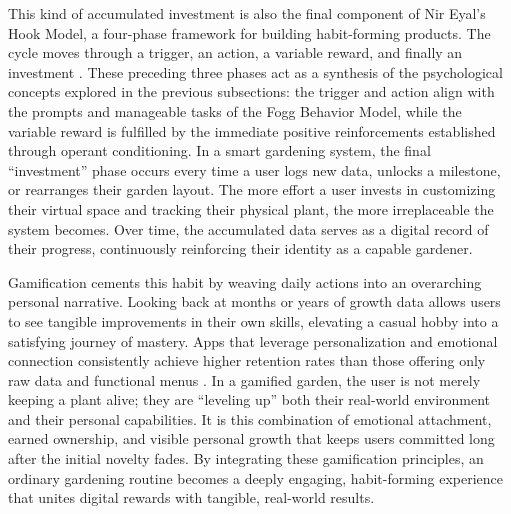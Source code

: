 This kind of accumulated investment is also the final component of Nir Eyal's Hook Model, a four-phase framework for building habit-forming products. The cycle moves through a trigger, an action, a variable reward, and finally an investment \cite{amplitudeHookModel, mediumHookFramework}. These preceding three phases act as a synthesis of the psychological concepts explored in the previous subsections: the trigger and action align with the prompts and manageable tasks of the Fogg Behavior Model, while the variable reward is fulfilled by the immediate positive reinforcements established through operant conditioning. In a smart gardening system, the final ``investment'' phase occurs every time a user logs new data, unlocks a milestone, or rearranges their garden layout. The more effort a user invests in customizing their virtual space and tracking their physical plant, the more irreplaceable the system becomes. Over time, the accumulated data serves as a digital record of their progress, continuously reinforcing their identity as a capable gardener.

Gamification cements this habit by weaving daily actions into an overarching personal narrative. Looking back at months or years of growth data allows users to see tangible improvements in their own skills, elevating a casual hobby into a satisfying journey of mastery. Apps that leverage personalization and emotional connection consistently achieve higher retention rates than those offering only raw data and functional menus \cite{Zimmer2022Personalized}. In a gamified garden, the user is not merely keeping a plant alive; they are ``leveling up'' both their real-world environment and their personal capabilities. It is this combination of emotional attachment, earned ownership, and visible personal growth that keeps users committed long after the initial novelty fades. By integrating these gamification principles, an ordinary gardening routine becomes a deeply engaging, habit-forming experience that unites digital rewards with tangible, real-world results.
